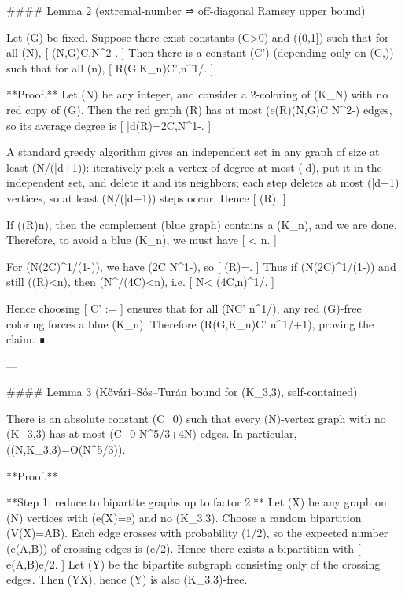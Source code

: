 #### Lemma 2 (extremal-number ⇒ off-diagonal Ramsey upper bound)

Let (G) be fixed. Suppose there exist constants (C>0) and (\varepsilon\in(0,1]) such that for all (N),
[
(N,G)\le C,N^{2-\varepsilon}.
]
Then there is a constant (C') (depending only on (C,\varepsilon)) such that for all (n),
[
R(G,K_n)\le C',n^{1/\varepsilon}.
]

**Proof.** Let (N) be any integer, and consider a 2-coloring of (K_N) with no red copy of (G). Then the red graph (R) has at most (e(R)\le {}(N,G)\le C N^{2-\varepsilon}) edges, so its average degree is
[
\bar d(R)=\le 2C,N^{1-\varepsilon}.
]

A standard greedy algorithm gives an independent set in any graph of size at least (N/(\bar d+1)): iteratively pick a vertex of degree at most (\bar d), put it in the independent set, and delete it and its neighbors; each step deletes at most (\bar d+1) vertices, so at least (N/(\bar d+1)) steps occur. Hence
[
\alpha(R)\ge {}\ge {}.
]

If (\alpha(R)\ge n), then the complement (blue graph) contains a (K_n), and we are done. Therefore, to avoid a blue (K_n), we must have
[
< n.
]

For (N\ge (2C)^{1/(1-\varepsilon)}), we have (2C N^{1-\varepsilon}), so
[
\alpha(R)\ge {}\ge {}=.
]
Thus if (N\ge (2C)^{1/(1-\varepsilon)}) and still (\alpha(R)<n), then (N^{\varepsilon}/(4C)<n), i.e.
[
N< (4C,n)^{1/\varepsilon}.
]

Hence choosing
[
C' := \max{}
]
ensures that for all (N\ge C' n^{1/\varepsilon}), any red (G)-free coloring forces a blue (K_n). Therefore (R(G,K_n)\le C' n^{1/\varepsilon}+1), proving the claim. ∎

---

#### Lemma 3 (Kővári–Sós–Turán bound for (K_{3,3}), self-contained)

There is an absolute constant (C_0) such that every (N)-vertex graph with no (K_{3,3}) has at most (C_0 N^{5/3}+4N) edges. In particular, ((N,K_{3,3})=O(N^{5/3})).

**Proof.**

**Step 1: reduce to bipartite graphs up to factor 2.**
Let (X) be any graph on (N) vertices with (e(X)=e) and no (K_{3,3}). Choose a random bipartition (V(X)=A\cup B). Each edge crosses with probability (1/2), so the expected number (e(A,B)) of crossing edges is (e/2). Hence there exists a bipartition with
[
e(A,B)\ge e/2.
]
Let (Y) be the bipartite subgraph consisting only of the crossing edges. Then (Y\subseteq X), hence (Y) is also (K_{3,3})-free.

